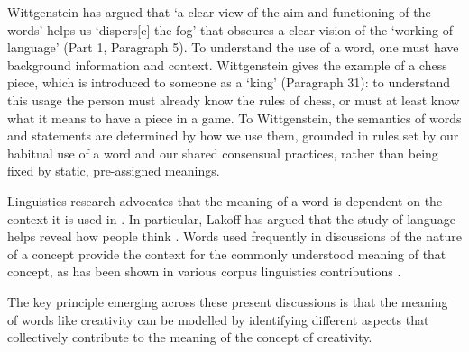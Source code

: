 \documentclass[10pt,letterpaper]{article}
\begin{document}
Wittgenstein \cite{wittgenstein58} has argued that `a clear view of the aim and functioning of the words' helps us `dispers[e] the fog' that obscures a clear vision of the `working of language' \cite{wittgenstein58} (Part 1, Paragraph 5). To understand the use of a word, one must have background information and context. Wittgenstein gives the example of a chess piece, which is introduced to someone as a `king' (Paragraph 31): to understand this usage the person must already know the rules of chess, or must at least know what it means to have a piece in a game. To Wittgenstein, the semantics of words and statements are determined by how we use them, grounded in rules set by our habitual use of a word and our shared consensual practices, rather than being fixed by static, pre-assigned meanings.        


Linguistics research advocates that the meaning of a word is dependent on the context it is used in \cite{firth57}. In particular, Lakoff has argued that the study of language helps reveal how people think \cite{lakoff87,lakoff80}. Words used frequently in discussions of the nature of a concept provide the context for the commonly understood meaning of that concept, as has been shown in various corpus linguistics contributions \cite{oakes98,rayson00,kilgarriff01,kilgarriff06}. 

The key principle emerging across these present discussions is that the meaning of words like creativity can be modelled by identifying different aspects that collectively contribute to the meaning of the concept of creativity. 

\end{document}
